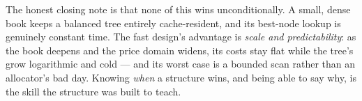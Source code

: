 \documentclass[11pt]{article}
\begin{document}
The honest closing note is that none of this wins unconditionally. A small,
dense book keeps a balanced tree entirely cache-resident, and its best-node
lookup is genuinely constant time. The fast design's advantage is
\emph{scale and predictability}: as the book deepens and the price domain
widens, its costs stay flat while the tree's grow logarithmic and cold ---
and its worst case is a bounded scan rather than an allocator's bad day.
Knowing \emph{when} a structure wins, and being able to say why, is the
skill the structure was built to teach.
\end{document}

